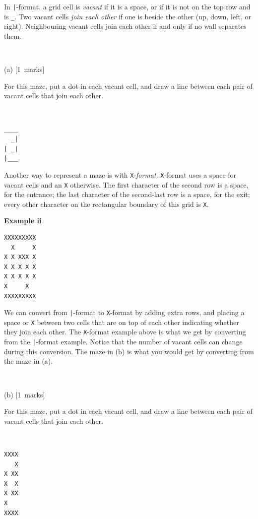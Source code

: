 \documentclass[12pt]{article}
\newcommand{\mymarks}[1]{\mbox{\small [#1 marks]}}
\begin{document}
In \texttt{|}-format,
a grid cell is {\em vacant} if it is a space, or
if it is not on the top row and is \verb&_&. Two vacant cells 
{\em join each other}
if one is beside the other (up, down, left, or right).
Neighbouring vacant cells join each other if 
and only if no wall separates them.

~

\noindent
(a) \mymarks{1} ~ ~
\begin{minipage}[c]{11cm}
For this maze, put a dot in each vacant cell,
and draw a line between each pair of vacant cells that 
join each other.
\end{minipage} ~ ~
\begin{minipage}[c]{3cm}
{\large\begin{verbatim}
____
  _|
| _|
|___

\end{verbatim}}
\end{minipage}

Another way to represent a maze is with \verb&X&-{\em format}.
\verb&X&-format uses a space for vacant cells and an \verb&X& otherwise.
The first character of the second row is a space,
for the entrance; 
the last character of the second-last row is a space, for the exit;
every other character on the rectangular boundary 
of this grid is \verb&X&.

\noindent
\begin{minipage}[c]{3cm}
{\bf Example ii}
\end{minipage}
\begin{minipage}[c]{10cm}
{\small\begin{verbatim}
XXXXXXXXX
  X     X
X X XXX X
X X X X X
X X X X X
X     X  
XXXXXXXXX

\end{verbatim}}
\end{minipage}

We can convert from \verb&|&-format to \verb&X&-format 
by adding extra rows, and placing a space or \verb&X&
between two cells that are on top of each other indicating 
whether they join each other.
The \verb&X&-format example above is what we get by converting from the \verb&|&-format example.
Notice that the number of vacant cells can change during this conversion.
The maze in (b) is what you would get by converting from
the maze in (a).

~

\noindent
(b) \mymarks{1} ~ ~
\begin{minipage}[c]{11cm}
For this maze, put a dot in each vacant cell,
and draw a line between each pair of vacant cells that join
each other.
\end{minipage} ~ ~
\begin{minipage}[c]{3cm}
{\small\begin{verbatim}
XXXX
   X
X XX
X  X
X XX
X  
XXXX
\end{verbatim}}
\end{minipage}
\end{document}
